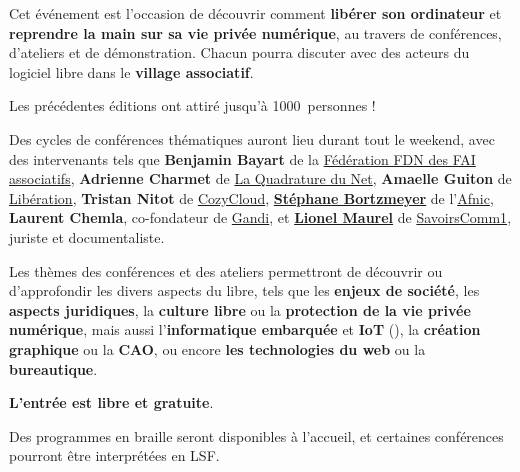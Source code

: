 
\Separateur

Cet événement est l'occasion de découvrir comment \textbf{libérer son ordinateur}
et \textbf{reprendre la main sur sa vie privée numérique},
au travers de conférences, d'ateliers et de démonstration.
Chacun pourra discuter avec des acteurs du logiciel libre dans le \textbf{village associatif}.

Les précédentes éditions ont attiré jusqu'à \num{1000}~personnes !

\Separateur

Des cycles de conférences thématiques auront lieu durant tout le weekend,
avec des intervenants tels que \textbf{Benjamin Bayart} de la \href{http://ffdn.org/}{Fédération FDN des FAI associatifs},
\textbf{Adrienne Charmet} de \href{http://laquadrature.net/}{La Quadrature du Net},
\textbf{Amaelle Guiton} de \href{http://www.liberation.fr/auteur/15260-amaelle-guiton}{Libération},
\textbf{Tristan Nitot} de \href{https://cozy.io/fr/}{CozyCloud},
\textbf{\href{http://www.bortzmeyer.org/}{Stéphane Bortzmeyer}} de l'\href{}{Afnic},
\textbf{Laurent Chemla}, co-fondateur de \href{http://gandi.net/}{Gandi},
et \textbf{\href{http://scinfolex.com/}{Lionel Maurel}} de \href{http://savoirscom1.info/}{SavoirsComm1}, juriste et documentaliste.

\Separateur

Les thèmes des conférences et des ateliers permettront de découvrir ou d'approfondir
les divers aspects du libre, tels que les \textbf{enjeux de société}, les \textbf{aspects juridiques},
la \textbf{culture libre} ou la \textbf{protection de la vie privée numérique},
mais aussi l'\textbf{informatique embarquée} et \textbf{IoT} (), la \textbf{création graphique} ou la \textbf{CAO},
ou encore \textbf{les technologies du web} ou la \textbf{bureautique}.

\Separateur

\textbf{L'entrée est libre et gratuite}.

\Separateur

Des programmes en braille seront disponibles à l'accueil, et certaines conférences pourront être interprétées en LSF.
